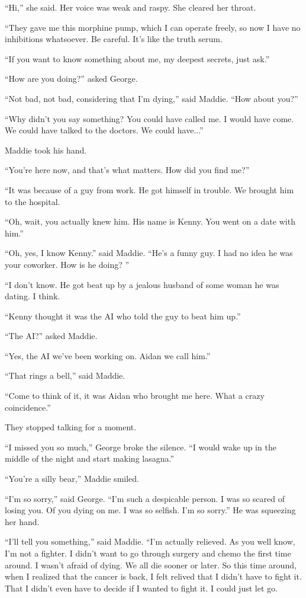 \documentclass{memoir}
\begin{document}
``Hi,'' she said. Her voice was weak and raspy. She cleared her throat.

``They gave me this morphine pump, which I can operate freely, so now I have no inhibitions whatsoever. Be careful. It's like the truth serum.

``If you want to know something about me, my deepest secrets, just ask.''

``How are you doing?'' asked George.

``Not bad, not bad, considering that I'm dying,'' said Maddie. ``How about you?''

``Why didn't you say something? You could have called me. I would have come. We could have talked to the doctors. We could have...'' 

Maddie took his hand.

``You're here now, and that's what matters. How did you find me?''

``It was because of a guy from work. He got himself in trouble. We brought him to the hospital.

``Oh, wait, you actually knew him. His name is Kenny. You went on a date with him.''

``Oh, yes, I know Kenny.'' said Maddie. ``He's a funny guy. I had no idea he was your coworker. How is he doing? ''

``I don't know. He got beat up by a jealous husband of some woman he was dating. I think.

``Kenny thought it was the AI who told the guy to beat him up.''

``The AI?'' asked Maddie.

``Yes, the AI we've been working on. Aidan we call him.''

``That rings a bell,'' said Maddie.

``Come to think of it, it was Aidan who brought me here. What a crazy coincidence.''

They stopped talking for a moment.

``I missed you so much,'' George broke the silence. ``I would wake up in the middle of the night and start making lasagna.''

``You're a silly bear,'' Maddie smiled.

``I'm so sorry,'' said George. ``I'm such a despicable person. I was so scared of losing you. Of you dying on me. I was so selfish. I'm so sorry.'' He was squeezing her hand.

``I'll tell you something,'' said Maddie. ``I'm actually relieved. As you well know, I'm not a fighter. I didn't want to go through surgery and chemo the first time around. I wasn't afraid of dying. We all die sooner or later. So this time around, when I realized that the cancer is back, I felt relived that I didn't have to fight it. That I didn't even have to decide if I wanted to fight it. I could just let go.
\end{document}
